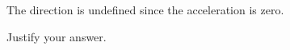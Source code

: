 \documentclass{../../../oss-classkick}
\begin{document}
\begin{enumerate}
\begin{enumerate}
    \vspace{.1in}\underline{\hspace{.3in}} The direction is undefined since the
    acceleration is zero.

    \vspace{.1in}Justify your answer.
  \end{enumerate}
  
   
%  
  \newpage
  

\end{enumerate}
\end{document}
